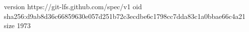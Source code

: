 version https://git-lfs.github.com/spec/v1
oid sha256:d9ab8d36c66859630e057d251b72c3ecdbe6c1798cc7dda83c1a0bbae66c4a21
size 1973
